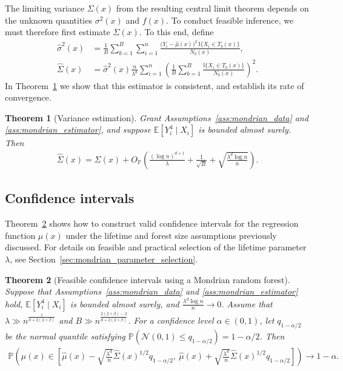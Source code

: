 \documentclass[11pt,lof]{puthesis}
\renewcommand{\P}{\ensuremath{\mathbb{P}}}
\newcommand{\E}{\ensuremath{\mathbb{E}}}
\newcommand{\I}{\ensuremath{\mathbb{I}}}
\newcommand{\cN}{\ensuremath{\mathcal{N}}}
\theoremstyle{break}
\newtheorem{theorem}{Theorem}[section]
\theoremstyle{proof}
\begin{document}
The limiting variance $\Sigma(x)$ from the resulting central limit theorem
depends on the unknown quantities $\sigma^2(x)$ and $f(x)$.
To conduct feasible inference, we must therefore first estimate
$\Sigma(x)$. To this end, define
%
\begin{align}
  \label{eq:mondrian_sigma2_hat}
  \hat\sigma^2(x)
  &=
  \frac{1}{B} \sum_{b=1}^{B} \sum_{i=1}^n
  \frac{\big(Y_i - \hat \mu(x)\big)^2 \, \I\{X_i \in T_b(x)\}} {N_b(x)}, \\
  \nonumber
  \hat\Sigma(x)
  &=
  \hat\sigma^2(x) \frac{n}{\lambda^d} \sum_{i=1}^n
  \left( \frac{1}{B} \sum_{b=1}^B \frac{\I\{X_i \in T_b(x)\}}{N_b(x)} \right)^2.
\end{align}
%
In Theorem~\ref{thm:mondrian_variance_estimation} we show that this
estimator is consistent, and establish its rate of convergence.
%
\begin{theorem}[Variance estimation]%
  \label{thm:mondrian_variance_estimation}
  Grant Assumptions~\ref{ass:mondrian_data} and \ref{ass:mondrian_estimator},
  and suppose $\E[Y_i^4 \mid X_i ]$ is bounded almost surely. Then
  \begin{align*}
    \hat\Sigma(x)
    = \Sigma(x)
    + O_\P \left(
      \frac{(\log n)^{d+1}}{\lambda}
      + \frac{1}{\sqrt B} + \sqrt{\frac{\lambda^d \log n}{n}}
    \right).
  \end{align*}

\end{theorem}

\subsection{Confidence intervals}

Theorem~\ref{thm:mondrian_confidence} shows how to construct valid confidence
intervals for the regression function $\mu(x)$ under the lifetime and forest
size assumptions previously discussed. For details on feasible and practical
selection of the lifetime parameter $\lambda$, see
Section~\ref{sec:mondrian_parameter_selection}.
%
\begin{theorem}[Feasible confidence intervals using a Mondrian random forest]%
  \label{thm:mondrian_confidence}
  Suppose that Assumptions~\ref{ass:mondrian_data} and
  \ref{ass:mondrian_estimator} hold,
  $\E[Y_i^4 \mid X_i ]$ is bounded almost surely,
  and $\frac{\lambda^d \log n}{n} \to 0$. Assume that
  $\lambda \gg n^{\frac{1}{d + 2(2 \wedge \beta)}}$
  and $B \gg n^{\frac{2 (2 \wedge \beta) - 2}{d + 2 (2 \wedge \beta)}}$.
  For a confidence level $\alpha \in (0, 1)$,
  let $q_{1 - \alpha / 2}$ be the normal quantile satisfying
  $\P \left( \cN(0, 1) \leq q_{1 - \alpha / 2} \right) = 1 - \alpha / 2$. Then
  \begin{align*}
    \P \left(
      \mu(x) \in
      \left[
        \hat \mu(x)
        - \sqrt{\frac{\lambda^d}{n}} \hat \Sigma(x)^{1/2}
        q_{1 - \alpha / 2}, \
        \hat \mu(x)
        + \sqrt{\frac{\lambda^d}{n}} \hat \Sigma(x)^{1/2}
        q_{1 - \alpha / 2}
      \right]
    \right)
    \to
    1 - \alpha.
  \end{align*}

\end{theorem}
\end{document}
